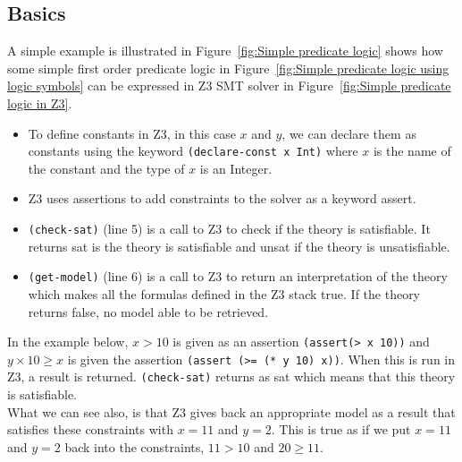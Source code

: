 \documentclass[a4paper]{report}
\begin{document}
\subsection{Basics}
A simple example is illustrated in Figure~\ref{fig:Simple predicate logic} shows how some simple first order predicate logic in Figure~\ref{fig:Simple predicate logic using logic symbols} can be expressed in Z3 SMT solver in  Figure~\ref{fig:Simple predicate logic in Z3}.
\begin{itemize}
\item To define constants in Z3, in this case $x$ and $y$, we can declare them as constants using the keyword \texttt{(declare-const x Int)} where $x$ is the name of the constant and the type of $x$ is an Integer.
\item Z3 uses assertions to add constraints to the solver as a keyword assert. 
\item \texttt{(check-sat)} (line 5) is a call to Z3 to check if the theory is satisfiable. It returns sat is the theory is satisfiable and unsat if the theory is unsatisfiable.
\item \texttt{(get-model)} (line 6) is a call to Z3 to return an interpretation of the theory which makes all the formulas defined in the Z3 stack true. If the theory returns false, no model able to be retrieved.  
\end{itemize}
In the example below, $x > 10$ is given as an assertion \texttt{(assert(> x 10))} and $y \times 10 \geq x$ is given the assertion \texttt{(assert (>= (* y 10) x))}. When this is run in Z3, a result is returned. \texttt{(check-sat)} returns as sat which means that this theory is satisfiable.\\ 
What we can see also, is that Z3 gives back an appropriate model as a result that satisfies these constraints with $x = 11$ and $y = 2$. This is true as if we put $x = 11$ and $y = 2$ back into the constraints, $11 > 10$ and $20 \geq 11$.
\end{document}
